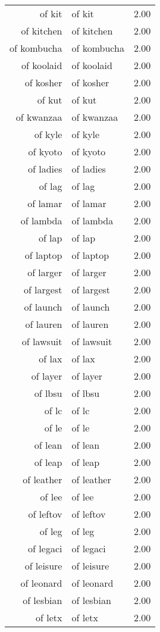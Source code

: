 \begin{table}[ht]
\begin{tabular}{rlr}
  of kit & of kit & 2.00 \\ 
  of kitchen & of kitchen & 2.00 \\ 
  of kombucha & of kombucha & 2.00 \\ 
  of koolaid & of koolaid & 2.00 \\ 
  of kosher & of kosher & 2.00 \\ 
  of kut & of kut & 2.00 \\ 
  of kwanzaa & of kwanzaa & 2.00 \\ 
  of kyle & of kyle & 2.00 \\ 
  of kyoto & of kyoto & 2.00 \\ 
  of ladies & of ladies & 2.00 \\ 
  of lag & of lag & 2.00 \\ 
  of lamar & of lamar & 2.00 \\ 
  of lambda & of lambda & 2.00 \\ 
  of lap & of lap & 2.00 \\ 
  of laptop & of laptop & 2.00 \\ 
  of larger & of larger & 2.00 \\ 
  of largest & of largest & 2.00 \\ 
  of launch & of launch & 2.00 \\ 
  of lauren & of lauren & 2.00 \\ 
  of lawsuit & of lawsuit & 2.00 \\ 
  of lax & of lax & 2.00 \\ 
  of layer & of layer & 2.00 \\ 
  of lbsu & of lbsu & 2.00 \\ 
  of lc & of lc & 2.00 \\ 
  of le & of le & 2.00 \\ 
  of lean & of lean & 2.00 \\ 
  of leap & of leap & 2.00 \\ 
  of leather & of leather & 2.00 \\ 
  of lee & of lee & 2.00 \\ 
  of leftov & of leftov & 2.00 \\ 
  of leg & of leg & 2.00 \\ 
  of legaci & of legaci & 2.00 \\ 
  of leisure & of leisure & 2.00 \\ 
  of leonard & of leonard & 2.00 \\ 
  of lesbian & of lesbian & 2.00 \\ 
  of letx & of letx & 2.00 \\ 

\end{tabular}
\end{table}
